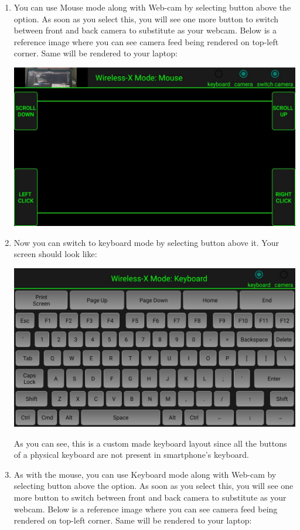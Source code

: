 \documentclass[12pt, letterpaper]{article}
\begin{document}
\begin{enumerate}
\item You can use Mouse mode along with Web-cam by selecting button above the option. As soon as you select this, you will see one more button to switch between front and back camera to substitute as your webcam. Below is a reference image where you can see camera feed being rendered on top-left corner. Same will be rendered to your laptop:
\begin{center}
    \includegraphics[scale=0.25]{images/mouseCamera.jpeg}
\end{center}
\item Now you can switch to keyboard mode by selecting button above it. Your screen should look like:
\begin{center}
    \includegraphics[scale=0.25]{images/keyboard.jpeg}
\end{center}
As you can see, this is a custom made keyboard layout since all the buttons of a physical keyboard are not present in smartphone's keyboard.
\item As with the mouse, you can use Keyboard mode along with Web-cam by selecting button above the option. As soon as you select this, you will see one more button to switch between front and back camera to substitute as your webcam. Below is a reference image where you can see camera feed being rendered on top-left corner. Same will be rendered to your laptop:

\end{enumerate}
\end{document}
